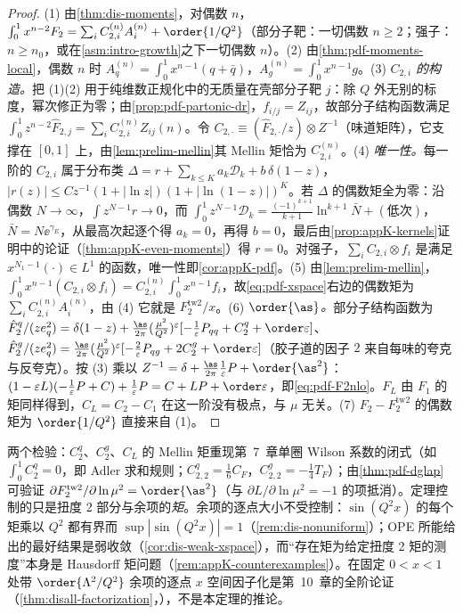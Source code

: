 \begin{proof}
(1) 由\cref{thm:dis-moments}，对偶数 $n$，$\int_0^1x^{n-2}F_2=\sum_iC^{(n)}_{2,i}A^{(n)}_i+\order{1/Q^2}$（部分子靶：一切偶数 $n\ge2$；强子：$n\ge n_0$，或在\cref{asm:intro-growth}之下一切偶数 $n$）。(2) 由\cref{thm:pdf-moments-local}，偶数 $n$ 时 $A^{(n)}_q=\int_0^1x^{n-1}(q+\bar q)$，$A^{(n)}_g=\int_0^1x^{n-1}g$。(3) \emph{$C_{2,i}$ 的构造。}把 (1)(2) 用于纯维数正规化中的无质量在壳部分子靶 $j$：除 $Q$ 外无别的标度，幂次修正为零；由\cref{prop:pdf-partonic-dr}，$f_{i/j}=Z_{ij}$，故部分子结构函数满足 $\int_0^1z^{n-2}\hat F_{2,j}=\sum_iC^{(n)}_{2,i}Z_{ij}(n)$。令 $C_{2,\cdot}\equiv(\hat F_{2,\cdot}/z)\otimes Z^{-1}$（味道矩阵），它支撑在 $[0,1]$ 上，由\cref{lem:prelim-mellin}其 Mellin 矩恰为 $C^{(n)}_{2,i}$。(4) \emph{唯一性。}每一阶的 $C_{2,i}$ 属于分布类 $\Delta=r+\sum_{k\le K}a_k\mathcal D_k+b\,\delta(1-z)$，$|r(z)|\le Cz^{-1}(1+|\ln z|)(1+|\ln(1-z)|)^K$。若 $\Delta$ 的偶数矩全为零：沿偶数 $N\to\infty$，$\int z^{N-1}r\to0$，而 $\int_0^1z^{N-1}\mathcal D_k=\frac{(-1)^{k+1}}{k+1}\ln^{k+1}\bar N+(\text{低次})$，$\bar N=N\ee^{\gamma_E}$，从最高次起逐个得 $a_k=0$，再得 $b=0$，最后由\cref{prop:appK-kernels}证明中的论证（\cref{thm:appK-even-moments}）得 $r=0$。对强子，$\sum_iC_{2,i}\otimes f_i$ 是满足 $x^{N_1-1}(\cdot)\in L^1$ 的函数，唯一性即\cref{cor:appK-pdf}。(5) 由\cref{lem:prelim-mellin}，$\int_0^1x^{n-1}(C_{2,i}\otimes f_i)=C^{(n)}_{2,i}\int_0^1x^{n-1}f_i$，故\cref{eq:pdf-xspace}右边的偶数矩为 $\sum_iC^{(n)}_{2,i}A^{(n)}_i$，由 (4) 它就是 $F_2^{\mathrm{tw2}}/x$。(6) \emph{$\order{\as}$。}部分子结构函数为 $\hat F_2^q/(ze_q^2)=\delta(1-z)+\frac{\as}{2\pi}(\frac{\mu^2}{Q^2})^\varepsilon[-\frac1\varepsilon P_{qq}+C_2^q+\order\varepsilon]$、$\hat F_2^g/(ze_q^2)=\frac{\as}{2\pi}(\frac{\mu^2}{Q^2})^\varepsilon[-\frac2\varepsilon P_{qg}+2C_2^g+\order\varepsilon]$（胶子道的因子 $2$ 来自每味的夸克与反夸克）。按 (3) 乘以 $Z^{-1}=\delta+\frac{\as}{2\pi}\frac1\varepsilon P+\order{\as^2}$：$(1-\varepsilon L)(-\frac1\varepsilon P+C)+\frac1\varepsilon P=C+LP+\order\varepsilon$，即\cref{eq:pdf-F2nlo}。$F_L$ 由 $F_1$ 的矩同样得到，$C_L=C_2-C_1$ 在这一阶没有极点，与 $\mu$ 无关。(7) $F_2-F_2^{\mathrm{tw2}}$ 的偶数矩为 $\order{1/Q^2}$ 直接来自 (1)。
\end{proof}

两个检验：$C_2^q$、$C_2^g$、$C_L$ 的 Mellin 矩重现第~7~章单圈 Wilson 系数的闭式（如 $\int_0^1C_2^q=0$，即 Adler 求和规则；$C^q_{2,2}=\frac16C_F$，$C^g_{2,2}=-\frac14T_F$）；由\cref{thm:pdf-dglap}可验证 $\partial F_2^{\mathrm{tw2}}/\partial\ln\mu^2=\order{\as^2}$（与 $\partial L/\partial\ln\mu^2=-1$ 的项抵消）。定理控制的只是扭度 2 部分与余项的\emph{矩}。余项的逐点大小不受控制：$\sin(Q^2x)$ 的每个矩乘以 $Q^2$ 都有界而 $\sup|\sin(Q^2x)|=1$（\cref{rem:dis-nonuniform}）；OPE 所能给出的最好结果是弱收敛（\cref{cor:dis-weak-xspace}），而“存在矩为给定扭度 2 矩的测度”本身是 Hausdorff 矩问题（\cref{rem:appK-counterexamples}）。在固定 $0<x<1$ 处带 $\order{\Lambda^2/Q^2}$ 余项的逐点 $x$ 空间因子化是第~10~章的全阶论证（\cref{thm:disall-factorization}，\tagA），不是本定理的推论。

